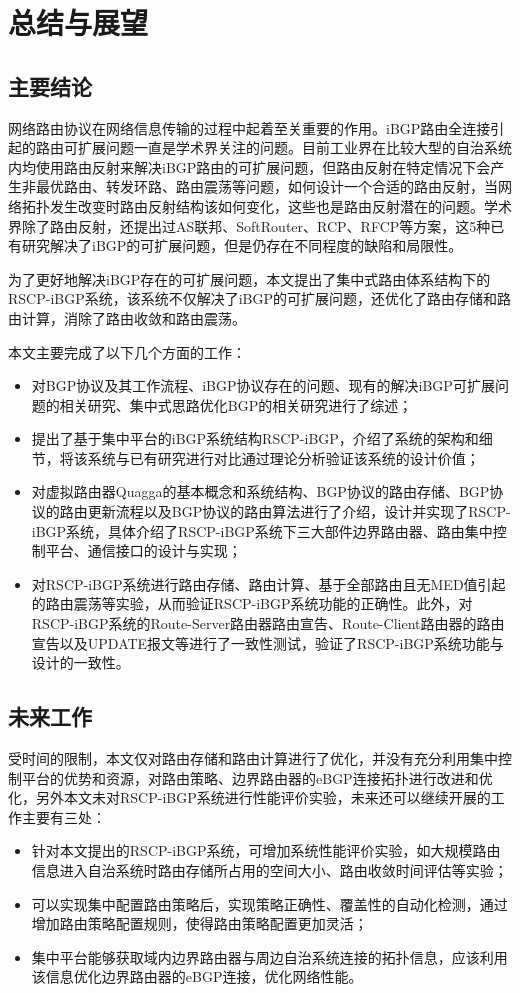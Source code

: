 \chapter{总结与展望}
\label{cha:summary}



\section{主要结论}
网络路由协议在网络信息传输的过程中起着至关重要的作用。iBGP路由全连接引起的路由可扩展问题一直是学术界关注的问题。目前工业界在比较大型的自治系统内均使用路由反射来解决iBGP路由的可扩展问题，但路由反射在特定情况下会产生非最优路由、转发环路、路由震荡等问题，如何设计一个合适的路由反射，当网络拓扑发生改变时路由反射结构该如何变化，这些也是路由反射潜在的问题。学术界除了路由反射，还提出过AS联邦、SoftRouter、RCP、RFCP等方案，这5种已有研究解决了iBGP的可扩展问题，但是仍存在不同程度的缺陷和局限性。

为了更好地解决iBGP存在的可扩展问题，本文提出了集中式路由体系结构下的RSCP-iBGP系统，该系统不仅解决了iBGP的可扩展问题，还优化了路由存储和路由计算，消除了路由收敛和路由震荡。

本文主要完成了以下几个方面的工作：
\begin{itemize}
  \item 对BGP协议及其工作流程、iBGP协议存在的问题、现有的解决iBGP可扩展问题的相关研究、集中式思路优化BGP的相关研究进行了综述；
  \item 提出了基于集中平台的iBGP系统结构RSCP-iBGP，介绍了系统的架构和细节，将该系统与已有研究进行对比通过理论分析验证该系统的设计价值；
  \item 对虚拟路由器Quagga的基本概念和系统结构、BGP协议的路由存储、BGP协议的路由更新流程以及BGP协议的路由算法进行了介绍，设计并实现了RSCP-iBGP系统，具体介绍了RSCP-iBGP系统下三大部件边界路由器、路由集中控制平台、通信接口的设计与实现；
  \item 对RSCP-iBGP系统进行路由存储、路由计算、基于全部路由且无MED值引起的路由震荡等实验，从而验证RSCP-iBGP系统功能的正确性。此外，对RSCP-iBGP系统的Route-Server路由器路由宣告、Route-Client路由器的路由宣告以及UPDATE报文等进行了一致性测试，验证了RSCP-iBGP系统功能与设计的一致性。
\end{itemize}


\section{未来工作}

受时间的限制，本文仅对路由存储和路由计算进行了优化，并没有充分利用集中控制平台的优势和资源，对路由策略、边界路由器的eBGP连接拓扑进行改进和优化，另外本文未对RSCP-iBGP系统进行性能评价实验，未来还可以继续开展的工作主要有三处：

\begin{itemize}
  \item 针对本文提出的RSCP-iBGP系统，可增加系统性能评价实验，如大规模路由信息进入自治系统时路由存储所占用的空间大小、路由收敛时间评估等实验；
  \item 可以实现集中配置路由策略后，实现策略正确性、覆盖性的自动化检测，通过增加路由策略配置规则，使得路由策略配置更加灵活；
  \item 集中平台能够获取域内边界路由器与周边自治系统连接的拓扑信息，应该利用该信息优化边界路由器的eBGP连接，优化网络性能。
\end{itemize} 